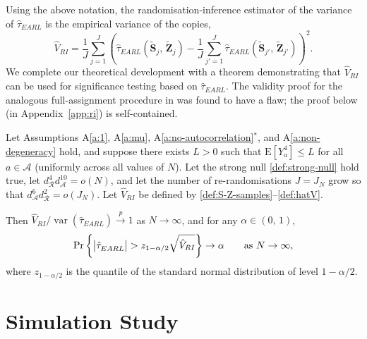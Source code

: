 \documentclass[sigconf]{acmart}
\newcommand{\E}{\mathrm E}
\DeclareMathOperator{\var}{var}
\begin{document}
Using the above notation, the randomisation-inference estimator of the variance of $\hat\tau^{\phantom{1}}_{EARL}$ is the empirical variance of the copies,
\begin{equation}\label{def:hatV}
    \hat V_{RI} = \frac{1}{J} \sum_{j=1}^J\left(\hat\tau^{\phantom{1}}_{EARL}(\tilde {\mathbf S}_j,\,\tilde{\mathbf Z}_j)-\frac 1 J\sum_{j'=1}^J\hat\tau^{\phantom{1}}_{EARL}(\tilde {\mathbf S}_{j'},\,\tilde{\mathbf Z}_{j'})\right)^2.
\end{equation}
We complete our theoretical development with a theorem demonstrating that $\hat V_{RI}$ can be used for significance testing based on $\hat\tau^{\phantom{1}}_{EARL}$. The validity proof for the analogous full-assignment procedure in \cite{shi2025scalableanalysisbipartiteexperiments} was found to have a flaw; the proof below (in Appendix~\ref{app:ri}) is self-contained.

\begin{theorem}\label{th:randomisation-inference}
    Let Assumptions A\ref{a:1}, A\ref{a:mu}, A\ref{a:no-autocorrelation}$^*$, and A\ref{a:non-degeneracy} hold, and suppose there exists $L>0$ such that $\E[Y_a^4] \le L$ for all $a\in\mathcal A$ (uniformly across all values of $N$). Let the strong null \eqref{def:strong-null} hold true, let $d^{4}_{\mathcal{R}}d^{10}_{\mathcal{A}}=o(N)$, and let the number of re-randomisations $J=J_N$ grow so that $d^{6}_{\mathcal{A}}d^{2}_{\mathcal{R}}=o(J_N)$. Let $\hat V_{RI}$ be defined by \eqref{def:S-Z-samples}--\eqref{def:hatV}.

    Then $\hat V_{RI} / \var(\hat\tau^{\phantom{1}}_{EARL})\stackrel{p}{\to} 1$ as $N\to\infty$, and
    for any $\alpha\in(0,\,1)$,
    \begin{equation*}
        \Pr\left\{\left|\hat\tau^{\phantom{1}}_{EARL}\right| > z_{1-\alpha/2}\sqrt{\hat V_{RI}}\right\}\to \alpha \qquad \textup{as }N\to\infty,
    \end{equation*}
    where $z_{1-\alpha/2}$ is the quantile of the standard normal distribution of level $1-\alpha/2$.
\end{theorem}

\section{Simulation Study}\label{sec:simulations}
\end{document}
